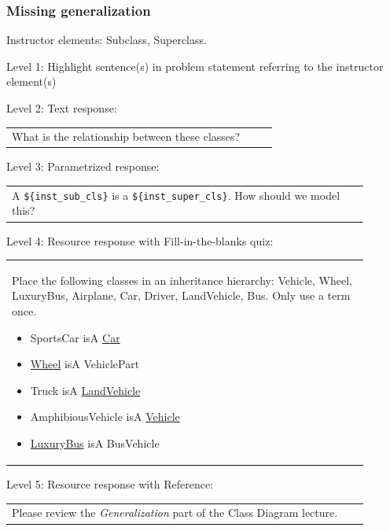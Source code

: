 \subsubsection{Missing generalization}

Instructor elements: Subclass, Superclass. \medskip

\noindent Level 1: Highlight sentence(s) in problem statement referring to the instructor element(s) \medskip

\noindent Level 2: Text response: \medskip

\begin{tabular}{|p{0.9\linewidth}}
What is the relationship between these classes?
\end{tabular} \medskip

\noindent Level 3: Parametrized response: \medskip

\begin{tabular}{|p{0.9\linewidth}}
A \verb|${inst_sub_cls}| is a \verb|${inst_super_cls}|. How should we model this?
\end{tabular} \medskip

\noindent Level 4: Resource response with Fill-in-the-blanks quiz: \medskip

\begin{tabular}{|p{0.9\linewidth}}

Place the following classes in an inheritance hierarchy: Vehicle, Wheel, LuxuryBus, Airplane, Car, Driver, LandVehicle, Bus. Only use a term once.

\begin{itemize}
    \item SportsCar isA \underline{Car}
    \item \underline{Wheel} isA VehiclePart
    \item Truck isA \underline{LandVehicle}
    \item AmphibiousVehicle isA \underline{Vehicle}
    \item \underline{LuxuryBus} isA BusVehicle
\end{itemize}

\end{tabular} \medskip

\noindent Level 5: Resource response with Reference: \medskip

\begin{tabular}{|p{0.9\linewidth}}
Please review the \textit{Generalization} part of the Class Diagram lecture.
\end{tabular} \medskip




